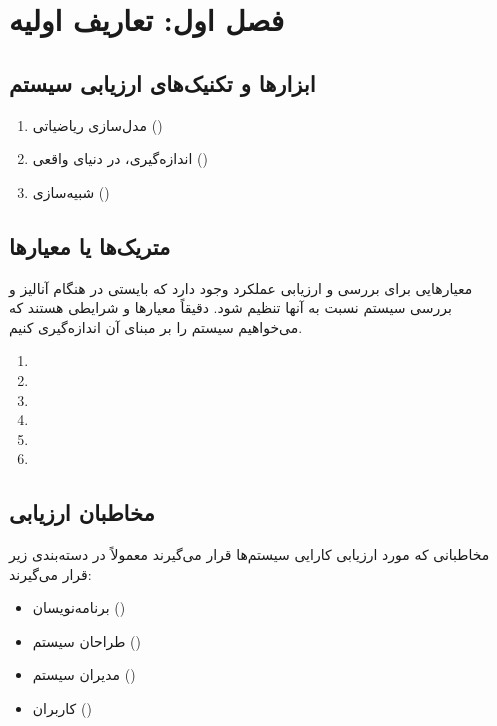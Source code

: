 \section{فصل اول: تعاریف اولیه}

\subsection{ابزار‌ها و تکنیک‌های ارزیابی سیستم}

\begin{enumerate}
    \item مدل‌سازی ریاضیاتی ()
    \item اندازه‌گیری، در دنیای واقعی ()
    \item شبیه‌سازی ()
\end{enumerate}

\subsection{متریک‌ها یا معیار‌ها}

معیار‌هایی برای بررسی و ارزیابی عملکرد وجود دارد که بایستی در هنگام آنالیز و
بررسی سیستم نسبت به آنها تنظیم شود. دقیقاً معیار‌ها و شرایطی هستند که می‌خواهیم
سیستم را بر مبنای آن اندازه‌گیری کنیم.

\begin{enumerate}
    \item {}
    \item {}
    \item {}
    \item {}
    \item {}
    \item {}
\end{enumerate}

\subsection{مخاطبان ارزیابی}

مخاطبانی که مورد ارزیابی کارایی سیستم‌ها قرار می‌گیرند معمولاً در دسته‌بندی زیر
قرار می‌گیرند:

\begin{itemize}
    \item برنامه‌نویسان ()
    \item طراحان سیستم ()
    \item مدیران سیستم ()
    \item کاربران ()
\end{itemize}

